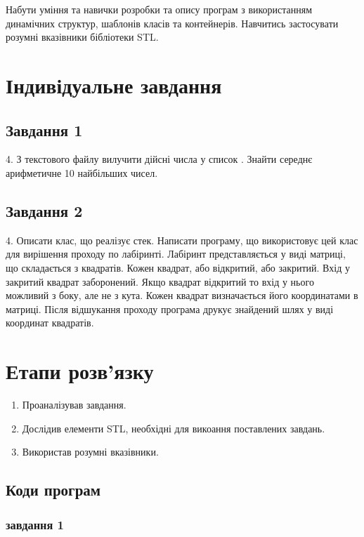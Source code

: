 \documentclass[a4paper, 12pt, oneside]{extarticle}
\begin{document}
\Margins



Набути уміння та навички розробки та опису програм з використанням
динамічних структур, шаблонів класів та контейнерів. Навчитись застосувати
розумні вказівники бібліотеки STL.

\section*{Індивідуальне завдання}

\subsection*{Завдання 1}

4.  З текстового файлу вилучити дійсні числа у список . Знайти середнє
арифметичне 10 найбільших чисел.

\subsection*{Завдання 2}

4. Описати клас, що реалізує стек. Написати програму, що використовує цей
клас для вирішення проходу по лабіринті. Лабіринт представляється у виді
матриці, що складається з квадратів. Кожен квадрат, або відкритий, або
закритий. Вхід у закритий квадрат заборонений. Якщо квадрат відкритий то вхід
у нього можливий з боку, але не з кута. Кожен квадрат визначається його
координатами в матриці. Після відшукання проходу програма друкує знайдений
шлях у виді координат квадратів.

\section*{Етапи розв'язку}

\begin{enumerate}
		\item Проаналізував завдання.
		\item Дослідив елементи STL, необхідні для викоання поставлених завдань.
		\item Використав розумні вказівники.
\end{enumerate}

\subsection*{Коди програм}

\subsubsection*{завдання 1}
\end{document}

